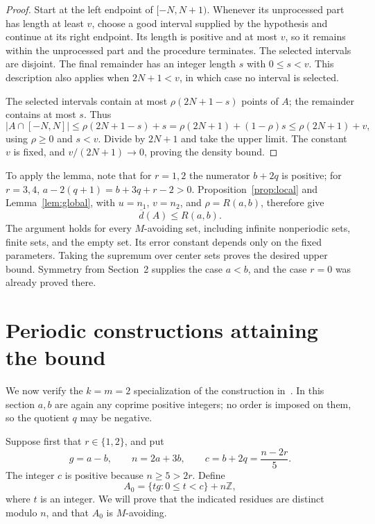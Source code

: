 \documentclass[11pt]{article}
\theoremstyle{remark}
\newcommand{\Z}{\mathbb Z}
\newcommand{\ud}{\overline d}
\begin{document}
\begin{proof}
Start at the left endpoint of \([-N,N+1)\). Whenever its unprocessed
part has length at least \(v\), choose a good interval supplied by the
hypothesis and continue at its right endpoint. Its length is positive
and at most \(v\), so it remains within the unprocessed part and the
procedure terminates. The selected intervals are disjoint. The final
remainder has an integer length \(s\) with \(0\le s<v\). This
description also applies when \(2N+1<v\), in which case no interval
is selected.

The selected intervals contain at most \(\rho(2N+1-s)\) points of
\(A\); the remainder contains at most \(s\). Thus
\[
 |A\cap[-N,N]|\le\rho(2N+1-s)+s
 =\rho(2N+1)+(1-\rho)s\le\rho(2N+1)+v,
\]
using \(\rho\ge0\) and \(s<v\). Divide by \(2N+1\) and take
the upper limit. The constant \(v\) is fixed, and
\(v/(2N+1)\to0\), proving the density bound.
\end{proof}

To apply the lemma, note that for \(r=1,2\) the numerator \(b+2q\)
is positive; for \(r=3,4\),
\(a-2(q+1)=b+3q+r-2>0\). Proposition~\ref{prop:local} and
Lemma~\ref{lem:global}, with \(u=n_1\), \(v=n_2\), and
\(\rho=R(a,b)\), therefore give
\begin{equation}\label{eq:upper-all}
 \ud(A)\le R(a,b).
\end{equation}
The argument holds for every \(M\)-avoiding set, including infinite
nonperiodic sets, finite sets, and the empty set. Its error constant
depends only on the fixed parameters. Taking the supremum over center
sets proves the desired upper bound. Symmetry from
Section~2 supplies the case \(a<b\), and the case \(r=0\) was
already proved there.

\section{Periodic constructions attaining the bound}

We now verify the \(k=m=2\) specialization of the construction
in~\cite[Section~2]{NS}. In this section \(a,b\) are again any
coprime positive integers; no order is imposed on them, so the
quotient \(q\) may be negative.

Suppose first that \(r\in\{1,2\}\), and put
\begin{equation}\label{eq:construction-data}
 g=a-b,\qquad n=2a+3b,\qquad
 c=b+2q=\frac{n-2r}{5}.
\end{equation}
The integer \(c\) is positive because \(n\ge5>2r\). Define
\begin{equation}\label{eq:construction}
 A_0=\{tg:0\le t<c\}+n\Z,
\end{equation}
where \(t\) is an integer. We will prove that the indicated residues
are distinct modulo \(n\), and that \(A_0\) is \(M\)-avoiding.
\end{document}
